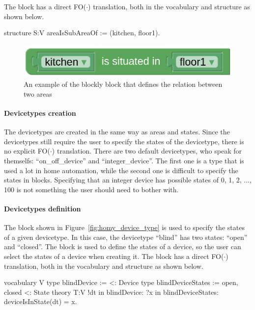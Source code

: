 \documentclass[11pt,a4paper]{report}
\newcommand{\fodot}{FO($\cdot$)\xspace}
\begin{document}
The block has a direct \fodot translation, both in the vocabulary and structure as shown below. 
\begin{idplisting}
structure S:V {
    areaIsSubAreaOf := {(kitchen, floor1)}.
}
\end{idplisting}

\begin{figure}
    \centering
    \includegraphics[width=0.8\linewidth]{images/homy_area_relation.png}
    \caption{An example of the blockly block that defines the relation between two areas}
    \label{fig:homy_area_relation}
\end{figure}

\paragraph{Devicetypes creation}
The devicetypes are created in the same way as areas and states. Since the devicetypes still require the user to specify the states of the devicetype, there is no explicit \fodot translation. There are two default devicetypes, who speak for themselfs: ``on\_off\_device'' and ``integer\_device''. The first one is a type that is used a lot in home automation, while the second one is difficult to specify the states in blocks. Specifying that an integer device has possible states of 0, 1, 2, ..., 100 is not something the user should need to bother with.

\paragraph{Devicetypes definition}
The block shown in Figure~\ref{fig:homy_device_type} is used to specify the states of a given devicetype. In this case, the devicetype ``blind'' has two states: ``open'' and ``closed''. The block is used to define the states of a device, so the user can select the states of a device when creating it. The block has a direct \fodot translation, both in the vocabulary and structure as shown below.
\begin{idplisting}
vocabulary V {
    type blindDevice := {} <: Device
    type blindDeviceStates := {open, closed} <: State
}
theory T:V {
    !dt in blindDevice: ?x in blindDeviceStates: deviceIsInState(dt) = x.
}
\end{idplisting}
\end{document}
